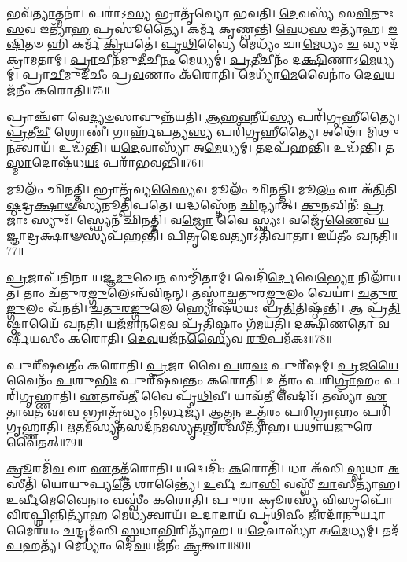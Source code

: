 𑌭𑌵᳴\-\ul{𑌤𑍍𑌯𑌾}\-𑌤𑍍𑌮𑌨𑌾॑।
𑌪𑌰𑌾॑𑌽\-\ul{𑌸𑍍𑌯} 𑌭𑍍𑌰𑌾𑌤𑍃᳴𑌵𑍍𑌯𑍋 𑌭𑌵𑌤𑌿।
\-\ul{𑌦𑍇}\-𑌵𑌸𑍍𑌯᳴ 𑌸\-\ul{𑌵𑌿}\-𑌤𑍁𑌃 \ul{𑌸}\-𑌵 𑌇𑌤𑍍𑌯𑌾᳴\-\ul{𑌹} 𑌪𑍍𑌰𑌸𑍂॑𑌤𑍍𑌯𑍈।
𑌕𑌰𑍍𑌮᳴ 𑌕𑍃𑌣𑍍𑌵𑌨𑍍𑌤𑌿 \ul{𑌵𑍇}\-𑌧\-\ul{𑌸} 𑌇𑌤𑍍𑌯𑌾᳴𑌹।
\-\ul{𑌇}\-\-\ul{𑌷𑌿}\-𑌤𑍞 𑌹𑌿 𑌕𑌰𑍍𑌮᳴ \ul{𑌕𑍍𑌰𑌿}\-𑌯𑌤𑍇॑।
\-\ul{𑌪𑍃}\-\-\ul{𑌥𑌿}\-𑌵𑍍𑌯𑍈 𑌮𑍇𑌧𑍍𑌯𑌂᳴ 𑌚𑌾\-\ul{𑌮𑍇}\-𑌧𑍍𑌯𑌂 \ul{𑌚} 𑌵𑍍𑌯𑍁𑌦᳴𑌕𑍍𑌰𑌾𑌮𑌤𑌾𑌮𑍍।
\-\ul{𑌪𑍍𑌰𑌾}\-𑌚𑍀𑌨᳴𑌮𑍁\-\ul{𑌦𑍀}\-𑌚𑍀\-\ul{𑌨𑌂} 𑌮𑍇𑌧𑍍𑌯𑌮𑍍॑।
\-\ul{𑌪𑍍𑌰}\-\-\ul{𑌤𑍀}\-𑌚𑍀𑌨𑌂᳴ 𑌦\-\ul{𑌕𑍍𑌷𑌿}\-𑌣𑌾\-𑌽\-\ul{𑌮𑍇}\-𑌧𑍍𑌯𑌮𑍍।
𑌪𑍍𑌰𑌾\-\ul{𑌚𑍀}\-𑌮𑍁𑌦𑍀᳴𑌚𑍀𑌂 𑌪𑍍𑌰\-\ul{𑌵}\-𑌣𑌾𑌂 𑌕᳴𑌰𑍋𑌤𑌿।
𑌮𑍇𑌧𑍍𑌯𑌾᳴\-\ul{𑌮𑍇}\-𑌵𑍈𑌨𑌾𑌂॑ 𑌦𑍇\-\ul{𑌵}\-𑌯𑌜᳴𑌨𑍀𑌂 𑌕𑌰𑍋𑌤𑌿॥75॥

𑌪𑍍𑌰𑌾𑌞𑍍𑌚𑍗᳴ 𑌵𑍇\-\ul{𑌦𑍍𑌯}\-\-\ul{𑍞}\-𑌸𑌾𑌵𑍁𑌨𑍍𑌨᳴𑌯𑌤𑌿।
\-\ul{𑌆}\-\-\ul{𑌹}\-\-\ul{𑌵}\-𑌨𑍀𑌯᳴\-\ul{𑌸𑍍𑌯} 𑌪𑌰𑌿᳴𑌗𑍃𑌹𑍀𑌤𑍍𑌯𑍈।
\-\ul{𑌪𑍍𑌰}\-𑌤𑍀\-\ul{𑌚𑍀} 𑌶𑍍𑌰𑍋𑌣𑍀॑।
𑌗𑌾𑌰𑍍𑌹᳴𑌪𑌤𑍍𑌯\-\ul{𑌸𑍍𑌯} 𑌪𑌰𑌿᳴𑌗𑍃𑌹𑍀𑌤𑍍𑌯𑍈।
𑌅𑌥𑍋᳴ 𑌮𑌿𑌥𑍁\-\ul{𑌨}\-𑌤𑍍𑌵𑌾𑌯᳴।
𑌉𑌦𑍍𑌧᳴𑌨𑍍𑌤𑌿।
𑌯\-\ul{𑌦𑍇}\-𑌵𑌾𑌸𑍍𑌯𑌾᳴ 𑌅\-\ul{𑌮𑍇}\-𑌧𑍍𑌯𑌮𑍍।
𑌤𑌦𑌪᳴𑌹𑌨𑍍𑌤𑌿।
𑌉𑌦𑍍𑌧᳴𑌨𑍍𑌤𑌿।
𑌤\-\ul{𑌸𑍍𑌮𑌾}\-𑌦𑍋𑌷᳴𑌧\-\ul{𑌯𑌃} 𑌪𑌰𑌾᳴𑌭𑌵𑌨𑍍𑌤𑌿॥76॥

𑌮𑍂𑌲𑌂᳴ 𑌛𑌿𑌨𑌤𑍍𑌤𑌿।
𑌭𑍍𑌰𑌾𑌤𑍃᳴𑌵𑍍𑌯\-\ul{𑌸𑍍𑌯𑍈}\-𑌵 𑌮𑍂𑌲𑌂᳴ 𑌛𑌿𑌨𑌤𑍍𑌤𑌿।
𑌮𑍂\-\ul{𑌲𑌂} 𑌵𑌾 𑌅᳴\-\ul{𑌤𑌿}\-𑌤𑌿\-\ul{𑌷𑍍𑌠}\-𑌦𑍍𑌰\-\ul{𑌕𑍍𑌷𑌾}\-\-\ul{𑍟}\-𑌸𑍍𑌯𑌨𑍂𑌤𑍍𑌪𑌿᳴𑌪𑌤𑍇।
𑌯𑌦𑍍𑌧𑌸𑍍𑌤𑍇᳴𑌨 \ul{𑌛𑌿}\-𑌨𑍍𑌦𑍍𑌯𑌾𑌤𑍍।
\-\ul{𑌕𑍁}\-\-\ul{𑌨}\-𑌖𑌿𑌨𑍀॑: \ul{𑌪𑍍𑌰}\-𑌜𑌾𑌃 𑌸𑍍𑌯𑍁𑌃᳴।
𑌸𑍍𑌫𑍍𑌯𑍇𑌨᳴ 𑌛𑌿𑌨𑌤𑍍𑌤𑌿।
𑌵\-\ul{𑌜𑍍𑌰𑍋} 𑌵𑍈 𑌸𑍍𑌫𑍍𑌯𑌃।
𑌵𑌜𑍍𑌰𑍇᳴\-\ul{𑌣𑍈}\-𑌵 \ul{𑌯}\-𑌜𑍍𑌞𑌾𑌦𑍍𑌰\-\ul{𑌕𑍍𑌷𑌾}\-\-\ul{𑍟}\-𑌸𑍍𑌯𑌪᳴𑌹𑌨𑍍𑌤𑌿।
\-\ul{𑌪𑌿}\-\-\ul{𑌤𑍃}\-\-\ul{𑌦𑍇}\-\-\ul{𑌵}\-𑌤𑍍𑌯𑌾\-𑌽𑌤𑌿᳴𑌖𑌾𑌤𑌾।
𑌇𑌯᳴𑌤𑍀𑌂 𑌖𑌨𑌤𑌿॥77॥

\-\ul{𑌪𑍍𑌰}\-𑌜𑌾𑌪᳴𑌤𑌿𑌨𑌾 𑌯𑌜𑍍𑌞\-\ul{𑌮𑍁}\-𑌖𑍇\-\ul{𑌨} 𑌸𑌮𑍍𑌮𑌿᳴𑌤𑌾𑌮𑍍।
𑌵𑍇𑌦𑌿᳴\-\ul{𑌰𑍍𑌦𑍇}\-𑌵𑍇\-\ul{𑌭𑍍𑌯𑍋} 𑌨𑌿𑌲𑌾᳴𑌯𑌤।
𑌤𑌾𑌂 𑌚᳴𑌤𑍁𑌰\-\ul{𑌙𑍍𑌗𑍁}\-𑌲𑍇\-𑌽𑌨𑍍𑌵᳴𑌵𑌿𑌨𑍍𑌦𑌨𑍍।
𑌤𑌸𑍍𑌮𑌾॑𑌚𑍍𑌚𑌤𑍁𑌰\-\ul{𑌙𑍍𑌗𑍁}\-𑌲𑌂 𑌖𑍇𑌯𑌾॑।
\-\ul{𑌚}\-\-\ul{𑌤𑍁}\-\-\ul{𑌰}\-\-\ul{𑌙𑍍𑌗𑍁}\-𑌲𑌂 𑌖᳴𑌨𑌤𑌿।
\-\ul{𑌚}\-\-\ul{𑌤𑍁}\-\-\ul{𑌰}\-\-\ul{𑌙𑍍𑌗𑍁}\-𑌲𑍇 𑌹𑍍𑌯𑍋𑌷᳴𑌧𑌯𑌃 𑌪𑍍𑌰\-\ul{𑌤𑌿}\-𑌤𑌿𑌷𑍍𑌠᳴𑌨𑍍𑌤𑌿।
𑌆 𑌪𑍍𑌰᳴\-\ul{𑌤𑌿}\-𑌷𑍍𑌠𑌾𑌯𑍈᳴ 𑌖𑌨𑌤𑌿।
𑌯𑌜᳴𑌮𑌾𑌨\-\ul{𑌮𑍇}\-𑌵 𑌪𑍍𑌰᳴\-\ul{𑌤𑌿}\-𑌷𑍍𑌠𑌾𑌂 𑌗᳴𑌮𑌯𑌤𑌿।
\-\ul{𑌦}\-\-\ul{𑌕𑍍𑌷𑌿}\-\-\ul{𑌣}\-𑌤𑍋 𑌵𑌰𑍍\mbox{}𑌷𑍀᳴𑌯𑌸𑍀𑌂 𑌕𑌰𑍋𑌤𑌿।
\-\ul{𑌦𑍇}\-\-\ul{𑌵}\-𑌯𑌜᳴𑌨\-\ul{𑌸𑍍𑌯𑍈}\-𑌵 \ul{𑌰𑍂}\-𑌪𑌮᳴𑌕𑌃॥78॥

𑌪𑍁𑌰𑍀᳴𑌷𑌵𑌤𑍀𑌂 𑌕𑌰𑍋𑌤𑌿।
\-\ul{𑌪𑍍𑌰}\-𑌜𑌾 𑌵𑍈 \ul{𑌪}\-𑌶\-\ul{𑌵𑌃} 𑌪𑍁𑌰𑍀᳴𑌷𑌮𑍍।
\-\ul{𑌪𑍍𑌰}\-𑌜\-\ul{𑌯𑍈}\-𑌵𑍈𑌨𑌂᳴ \ul{𑌪}\-𑌶𑍁\-\ul{𑌭𑌿𑌃} 𑌪𑍁𑌰𑍀᳴𑌷𑌵𑌨𑍍𑌤𑌂 𑌕𑌰𑍋𑌤𑌿।
𑌉𑌤𑍍𑌤᳴𑌰𑌂 𑌪𑌰𑌿\-\ul{𑌗𑍍𑌰𑌾}\-𑌹𑌂 𑌪𑌰𑌿᳴𑌗𑍃𑌹𑍍𑌣𑌾𑌤𑌿।
\-\ul{𑌏}\-𑌤𑌾𑌵᳴\-\ul{𑌤𑍀} 𑌵𑍈 𑌪𑍃᳴\-\ul{𑌥𑌿}\-𑌵𑍀।
𑌯𑌾𑌵᳴\-\ul{𑌤𑍀} 𑌵𑍇𑌦𑌿𑌃᳴।
𑌤𑌸𑍍𑌯𑌾᳴ \ul{𑌏}\-𑌤𑌾𑌵᳴𑌤 \ul{𑌏}\-𑌵 𑌭𑍍𑌰𑌾𑌤𑍃᳴𑌵𑍍𑌯𑌂 \ul{𑌨𑌿}\-𑌰𑍍𑌭𑌜𑍍𑌯᳴।
\-\ul{𑌆}\-𑌤𑍍𑌮\-\ul{𑌨} 𑌉𑌤𑍍𑌤᳴𑌰𑌂 𑌪𑌰𑌿\-\ul{𑌗𑍍𑌰𑌾}\-𑌹𑌂 𑌪𑌰𑌿᳴𑌗𑍃𑌹𑍍𑌣𑌾𑌤𑌿।
\-\ul{𑌋}\-𑌤𑌮᳴𑌸𑍍𑌯𑍃\-\ul{𑌤}\-𑌸𑌦᳴𑌨𑌮𑌸𑍍𑌯𑍃\-\ul{𑌤}\-𑌶𑍍𑌰𑍀\-\ul{𑌰}\-𑌸𑍀𑌤𑍍𑌯𑌾᳴𑌹।
\-\ul{𑌯}\-\-\ul{𑌥𑌾}\-\-\ul{𑌯}\-𑌜𑍁\-\ul{𑌰𑍇}\-𑌵𑍈𑌤𑌤𑍍॥79॥

\-\ul{𑌕𑍍𑌰𑍂}\-𑌰𑌮𑌿᳴\-\ul{𑌵} 𑌵𑌾 \ul{𑌏}\-𑌤𑌤𑍍𑌕᳴𑌰𑍋𑌤𑌿।
𑌯𑌦𑍍𑌵𑍇𑌦𑌿𑌂᳴ \ul{𑌕}\-𑌰𑍋𑌤𑌿᳴।
𑌧𑌾 𑌅᳴𑌸𑌿 \ul{𑌸𑍍𑌵}\-𑌧𑌾 \ul{𑌅}\-𑌸𑍀𑌤𑌿᳴ 𑌯𑍋𑌯𑍁𑌪𑍍𑌯\-\ul{𑌤𑍇} 𑌶𑌾𑌨𑍍𑌤𑍍𑌯𑍈॑।
\-\ul{𑌉}\-𑌰𑍍𑌵𑍀 𑌚𑌾\-\ul{𑌸𑌿} 𑌵𑌸𑍍𑌵𑍀᳴ \ul{𑌚𑌾}\-𑌸𑍀𑌤𑍍𑌯𑌾᳴𑌹।
\-\ul{𑌉}\-𑌰𑍍𑌵𑍀\-\ul{𑌮𑍇}\-𑌵𑍈\-\ul{𑌨𑌾𑌂} 𑌵𑌸𑍍𑌵𑍀𑌂॑ 𑌕𑌰𑍋𑌤𑌿।
\-\ul{𑌪𑍁}\-𑌰𑌾 \ul{𑌕𑍍𑌰𑍂}\-𑌰𑌸𑍍𑌯᳴ \ul{𑌵𑌿}\-𑌸𑍃𑌪𑍋᳴ 𑌵𑌿𑌰\-\ul{𑌪𑍍𑌶𑌿}\-𑌨𑍍𑌨𑌿𑌤𑍍𑌯𑌾᳴𑌹 𑌮𑍇\-\ul{𑌧𑍍𑌯}\-𑌤𑍍𑌵𑌾𑌯᳴।
\-\ul{𑌉}\-\-\ul{𑌦𑌾}\-𑌦𑌾𑌯᳴ 𑌪𑍃\-\ul{𑌥𑌿}\-𑌵𑍀𑌂 \ul{𑌜𑍀}\-𑌰𑌦𑌾᳴\-\ul{𑌨𑍁}\-𑌰𑍍𑌯𑌾𑌮𑍈𑌰᳴𑌯𑌂 \ul{𑌚}\-𑌨𑍍𑌦𑍍𑌰𑌮᳴𑌸𑌿 \ul{𑌸𑍍𑌵}\-𑌧𑌾\-\ul{𑌭𑌿}\-𑌰𑌿𑌤𑍍𑌯𑌾᳴𑌹।
𑌯\-\ul{𑌦𑍇}\-𑌵𑌾𑌸𑍍𑌯𑌾᳴ 𑌅\-\ul{𑌮𑍇}\-𑌧𑍍𑌯𑌮𑍍।
𑌤𑌦᳴\-\ul{𑌪}\-𑌹𑌤𑍍𑌯᳴।
𑌮𑍇𑌧𑍍𑌯𑌾𑌂॑ 𑌦𑍇\-\ul{𑌵}\-𑌯𑌜᳴𑌨𑍀𑌂 \ul{𑌕𑍃}\-𑌤𑍍𑌵𑌾॥80॥

